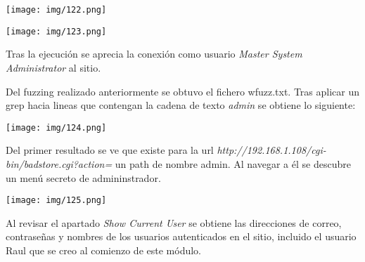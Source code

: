 \documentclass[12pt,oneside,a4paper]{book}
\begin{document}
\begin{enumerate}
\begin{center}
    \texttt{[image: img/122.png]}
\end{center}

\vspace{1em}

\begin{center}
    \texttt{[image: img/123.png]}
\end{center}

\vspace{1em}

\hspace{20pt}
Tras la ejecución se aprecia la conexión como usuario \textit{Master System Administrator} al sitio. 

\vspace{1em}

\hspace{20pt}
Del fuzzing realizado anteriormente se obtuvo el fichero wfuzz.txt. Tras aplicar un grep hacia lineas que contengan la cadena de texto \textit{admin} se obtiene lo siguiente:

\vspace{1em}

\begin{center}
    \texttt{[image: img/124.png]}
\end{center}

\vspace{1em}

\hspace{20pt}
Del primer resultado se ve que existe para la url \textit{http://192.168.1.108/cgi-bin/badstore.cgi?action=} un path de nombre admin. Al navegar a él se descubre un menú secreto de admininstrador.

\vspace{1em}

\begin{center}
    \texttt{[image: img/125.png]}
\end{center}

\vspace{1em}

\hspace{20pt}
Al revisar el apartado \textit{Show Current User} se obtiene las direcciones de correo, contraseñas y nombres de los usuarios autenticados en el sitio, incluido el usuario Raul que se creo al comienzo de este módulo.

\vspace{1em}


\end{enumerate}
\end{document}
